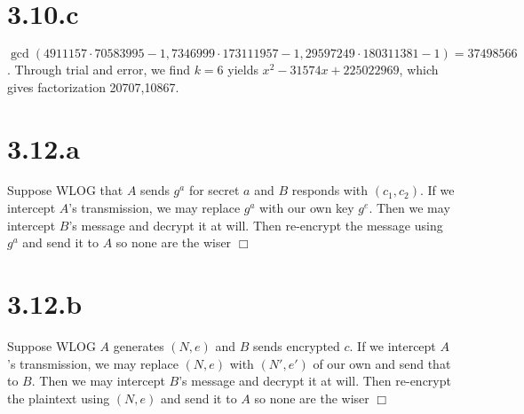 \documentclass{article}
\begin{document}
\section*{3.10.c}
$\gcd(4911157 \cdot 70583995 - 1, 7346999 \cdot 173111957 - 1, 29597249 \cdot 180311381 - 1) = 37498566$. Through trial and error, we find $k=6$ yields $x^2 - 31574x + 225022969$, which gives factorization 20707,10867.

\section*{3.12.a}
Suppose WLOG that $A$ sends $g^{a}$ for secret $a$ and $B$ responds with $(c_1,c_2)$. If we intercept $A$'s transmission, we may replace $g^a$ with our own key $g^e$. Then we may intercept $B$'s message and decrypt it at will. Then re-encrypt the message using $g^a$ and send it to $A$ so none are the wiser $\Box$

\section*{3.12.b}
Suppose WLOG $A$ generates $(N,e)$ and $B$ sends encrypted $c$. If we intercept $A$'s transmission, we may replace $(N,e)$ with $(N',e')$ of our own and send that to $B$. Then we may intercept $B$'s message and decrypt it at will. Then re-encrypt the plaintext using $(N,e)$ and send it to $A$ so none are the wiser $\Box$
\end{document}
